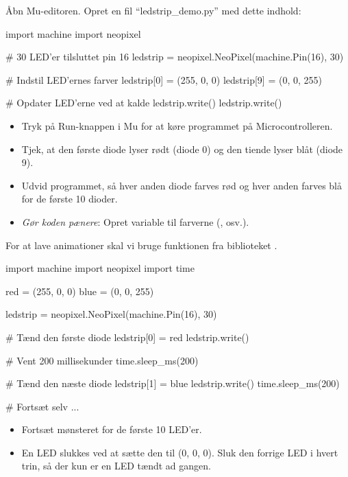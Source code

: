 \documentclass{ucph-handout}
\begin{document}
\begin{exercisebox}[adjusted title=Første MicroPython program]
Åbn Mu-editoren. Opret en fil ``ledstrip\_demo.py'' med dette indhold:
\begin{python}
import machine
import neopixel

# 30 LED'er tilsluttet pin 16
ledstrip = neopixel.NeoPixel(machine.Pin(16), 30)

# Indstil LED'ernes farver
ledstrip[0] = (255, 0, 0)
ledstrip[9] = (0, 0, 255)

# Opdater LED'erne ved at kalde ledstrip.write()
ledstrip.write()
\end{python}

\begin{itemize}
\item Tryk på Run-knappen i Mu for at køre programmet på Microcontrolleren.
\item Tjek, at den første diode lyser rødt (diode 0) og den tiende lyser blåt (diode 9).
\end{itemize}

\begin{itemize}
\item Udvid programmet, så hver anden diode farves rød og hver anden farves blå for de første 10 dioder.
\item \textit{Gør koden pænere}: Opret variable til farverne (, osv.).
\end{itemize}
\end{exercisebox}
\newpage
\begin{exercisebox}[adjusted title=Animationer]
For at lave animationer skal vi bruge funktionen  fra
biblioteket .

\begin{python}
import machine
import neopixel
import time

red = (255, 0, 0)
blue = (0, 0, 255)

ledstrip = neopixel.NeoPixel(machine.Pin(16), 30)

# Tænd den første diode
ledstrip[0] = red
ledstrip.write()

# Vent 200 millisekunder
time.sleep_ms(200)

# Tænd den næste diode
ledstrip[1] = blue
ledstrip.write()
time.sleep_ms(200)

# Fortsæt selv ...
\end{python}

\begin{itemize}
\item Fortsæt mønsteret for de første 10 LED'er.
\item En LED slukkes ved at sætte den til (0, 0, 0). Sluk den forrige
  LED i hvert trin, så der kun er en LED tændt ad gangen.
\end{itemize}
\end{exercisebox}
\end{document}
